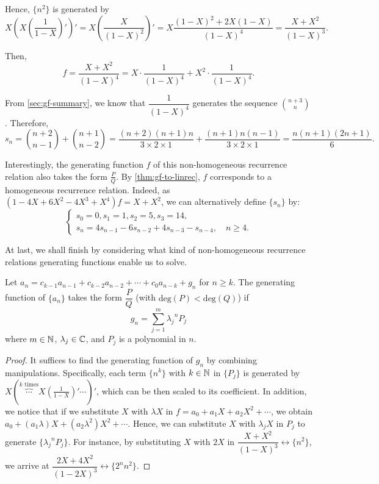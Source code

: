 \documentclass[a4paper, 12pt]{report}
\begin{document}
Hence, $\{n^2\}$ is generated by 
\[X \left(X \left(\frac{1}{1 - X}\right)'\right)' = X \left( \frac{X}{(1 - X)^2} \right)' = X \frac{(1 - X)^2 + 2 X (1 - X)}{(1 - X)^4} = \frac{X + X^2}{(1 - X)^3}.\]

Then, 
\[f = \frac{X + X^2}{(1 - X)^4} = X \cdot \frac{1}{(1 - X)^4} + X^2 \cdot \frac{1}{(1 - X)^4}.\]

From \cref{sec:gf-summary}, we know that $\dfrac{1}{(1 - X)^4}$ generates the sequence $\binom{n + 3}{n}$. Therefore,
\[s_n = \binom{n + 2}{n - 1} + \binom{n + 1}{n - 2} = \frac{(n + 2) (n + 1) n}{3 \times 2 \times 1} + \frac{(n + 1) n (n - 1)}{3 \times 2 \times 1} = \frac{n (n + 1) (2n + 1)}{6}.\]

Interestingly, the generating function $f$ of this non-homogeneous recurrence relation also takes the form $\frac{P}{Q}$. By \cref{thm:gf-to-linrec}, $f$ corresponds to a homogeneous recurrence relation. Indeed, as $(1 - 4X + 6X^2 - 4X^3 + X^4) f = X + X^2$, we can alternatively define $\{s_n\}$ by:
\[
\begin{cases}
s_0 = 0, s_1 = 1, s_2 = 5, s_3 = 14,\\
s_n = 4s_{n - 1} - 6s_{n - 2} + 4 s_{n - 3} - s_{n - 4}, \quad n \geq 4.
\end{cases}
\]

At last, we shall finish by considering what kind of non-homogeneous recurrence relations generating functions enable us to solve.
\begin{thm}
Let $a_n = c_{k - 1}a_{n - 1} + c_{k - 2}a_{n - 2} + \cdots + c_0 a_{n - k} + g_n$ for $n \geq k$. The generating function of $\{a_n\}$ takes the form $\dfrac{P}{Q}$ (with $\mathrm{deg}(P) < \mathrm{deg}(Q)$) if \[g_n = \sum_{j = 1}^{m} {\lambda_j}^n P_j\]
where $m \in \mathbb{N}$, $\lambda_j \in \mathbb{C}$, and $P_j$ is a polynomial in $n$.
\end{thm}
\begin{proof}
It suffices to find the generating function of $g_n$ by combining manipulations. Specifically, each term $\{n^k\}$ with $k \in \mathbb{N}$ in $\{P_j\}$ is generated by $X\left(\overbrace{\cdots}^{k \text{ times}} X\left(\frac{1}{1 - X}\right)'\cdots\right)'$, which can be then scaled to its coefficient. In addition, we notice that if we substitute $X$ with $\lambda X$ in $f = a_0 + a_1 X + a_2 X^2 + \cdots$, we obtain $a_0 + (a_1 \lambda) X + (a_2 \lambda^2) X^2 + \cdots$. Hence, we can substitute $X$ with $\lambda_j X$ in $P_j$ to generate $\{{\lambda_j}^n P_j\}$. For instance, by substituting $X$ with $2X$ in $\dfrac{X + X^2}{(1 - X)^3} \longleftrightarrow \{n^2\}$, we arrive at $\dfrac{2X + 4X^2}{(1 - 2X)^3} \longleftrightarrow \{2^n n^2\}$.
\end{proof}
\end{document}
